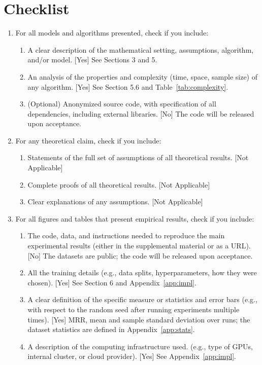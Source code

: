 \documentclass[twoside]{article}
\begin{document}


\clearpage
\section*{Checklist}

\begin{enumerate}

  \item For all models and algorithms presented, check if you include:
  \begin{enumerate}
    \item A clear description of the mathematical setting, assumptions, algorithm, and/or model. [Yes] See Sections 3 and 5.
    \item An analysis of the properties and complexity (time, space, sample size) of any algorithm. [Yes] See Section 5.6 and Table~\ref{tab:complexity}.
    \item (Optional) Anonymized source code, with specification of all dependencies, including external libraries. [No] The code will be released upon acceptance.
  \end{enumerate}

  \item For any theoretical claim, check if you include:
  \begin{enumerate}
    \item Statements of the full set of assumptions of all theoretical results. [Not Applicable]
    \item Complete proofs of all theoretical results. [Not Applicable]
    \item Clear explanations of any assumptions. [Not Applicable]
  \end{enumerate}

  \item For all figures and tables that present empirical results, check if you include:
  \begin{enumerate}
    \item The code, data, and instructions needed to reproduce the main experimental results (either in the supplemental material or as a URL). [No] The datasets are public; the code will be released upon acceptance.
    \item All the training details (e.g., data splits, hyperparameters, how they were chosen). [Yes] See Section 6 and Appendix~\ref{app:impl}.
    \item A clear definition of the specific measure or statistics and error bars (e.g., with respect to the random seed after running experiments multiple times). [Yes] MRR, mean and sample standard deviation over runs; the dataset statistics are defined in Appendix~\ref{app:stats}.
    \item A description of the computing infrastructure used. (e.g., type of GPUs, internal cluster, or cloud provider). [Yes] See Appendix~\ref{app:impl}.
  \end{enumerate}


\end{enumerate}
\end{document}
